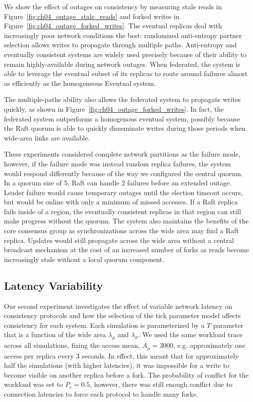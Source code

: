 We show the effect of outages on consistency by measuring stale reads in Figure~\ref{fig:ch04_outage_stale_reads} and forked writes in Figure~\ref{fig:ch04_outage_forked_writes}.
The eventual replicas deal with increasingly poor network conditions the best: randomized anti-entropy partner selection allows writes to propagate through multiple paths.
Anti-entropy and eventually consistent systems are widely used precisely because of their ability to remain highly-available during network outages.
When federated, the system is able to leverage the eventual subset of its replicas to route around failures almost as efficiently as the homogeneous Eventual system.

The multiple-paths ability also allows the federated system to propagate writes quickly, as shown in Figure~\ref{fig:ch04_outage_forked_writes}.
In fact, the federated system outperforms a homogenous eventual system, possibly because the Raft quorum is able to quickly disseminate writes during those periods when wide-area links are available.

These experiments considered complete network partitions as the failure mode, however, if the failure mode was instead random replica failures, the system would respond differently because of the way we configured the central quorum.
In a quorum size of 5, Raft can handle 2 failures before an extended outage.
Leader failure would cause temporary outages until the election timeout
occurs, but would be online with only a minimum of missed accesses.
If a Raft replica fails inside of a region, the eventually consistent replicas in that region can still make progress without the quorum.
The system also maintains the benefits of the core consensus group as synchronizations across the wide area may find a Raft replica.
Updates would still propagate across the wide area without a central broadcast mechanism at the cost of an increased number of forks as reads become increasingly stale without a local quorum component.

\subsection{Latency Variability}
\label{ch04_latency_variation}

Our second experiment investigates the effect of variable network latency on consistency protocols and how the selection of the tick parameter model affects consistency for each system.
Each simulation is parameterized by a $T$ parameter that is a function of the wide area $\lambda_{\mu}$ and $\lambda_{\sigma}$.
We used the same workload trace across all simulations, fixing the access mean, $A_\mu=3000$, e.g. approximately one access per replica every 3 seconds.
In effect, this meant that for approximately half the simulations (with higher latencies), it was impossible for a write to become visible on another replica before a fork.
The probability of conflict for the workload was set to $P_c=0.5$, however, there was still enough conflict due to connection latencies to force each protocol to handle many forks.

